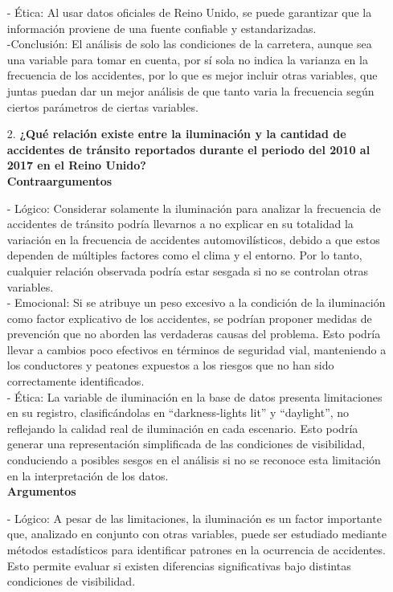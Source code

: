 \documentclass[12pt]{article}
\begin{document}
\begin{itemize}
    - Ética: Al usar datos oficiales de Reino Unido, se puede garantizar que la información proviene de una fuente confiable y estandarizadas. \\
    
    -Conclusión: El análisis de solo las condiciones de la carretera, aunque sea una variable para tomar en cuenta, por sí sola no indica la varianza en la frecuencia de los accidentes, por lo que es mejor incluir otras variables, que juntas puedan dar un mejor análisis de que tanto varia la frecuencia según ciertos parámetros de ciertas variables. \\ 
     
    \item[2.] \textbf{¿Qué relación existe entre la iluminación y la cantidad de accidentes de tránsito reportados durante el periodo del 2010 al 2017 en el Reino Unido?} \\
    
    \textbf{Contraargumentos}
    
    - Lógico: Considerar solamente la iluminación para analizar la frecuencia de accidentes de tránsito podría llevarnos a no explicar en su totalidad la variación en la frecuencia de accidentes automovilísticos, debido a que estos dependen de múltiples factores como el clima y el entorno. Por lo tanto, cualquier relación observada podría estar sesgada si no se controlan otras variables. \\
    
    - Emocional: Si se atribuye un peso excesivo a la condición de la iluminación como factor explicativo de los accidentes, se podrían proponer medidas de prevención que no aborden las verdaderas causas del problema. Esto podría llevar a cambios poco efectivos en términos de seguridad vial, manteniendo a los conductores y peatones expuestos a los riesgos que no han sido correctamente identificados. \\
    
    - Ética: La variable de iluminación en la base de datos presenta limitaciones en su registro, clasificándolas en “darkness-lights lit” y “daylight”, no reflejando la calidad real de iluminación en cada escenario. Esto podría generar una representación simplificada de las condiciones de visibilidad, conduciendo a posibles sesgos en el análisis si no se reconoce esta limitación en la interpretación de los datos. \\

    \textbf{Argumentos} 
    
    - Lógico: A pesar de las limitaciones, la iluminación es un factor importante que, analizado en conjunto con otras variables, puede ser estudiado mediante métodos estadísticos para identificar patrones en la ocurrencia de accidentes. Esto permite evaluar si existen diferencias significativas bajo distintas condiciones de visibilidad. \\
    

\end{itemize}
\end{document}
